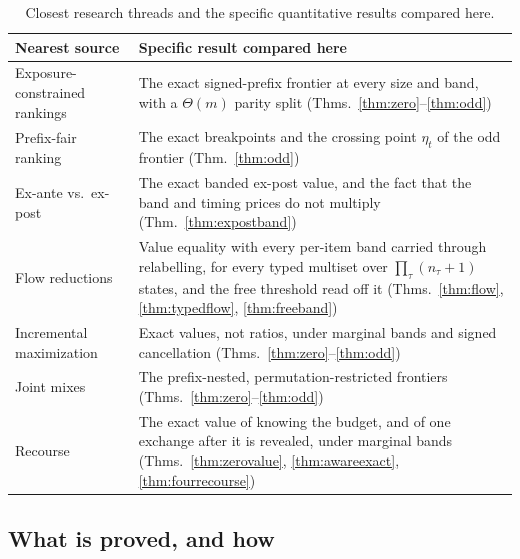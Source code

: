 \begin{table}[h]
\caption{Closest research threads and the specific quantitative results compared here.}
\label{tab:prior}
\centering
\footnotesize
\begin{tabular}{@{}p{}p{}@{}}
\toprule
Nearest source & Specific result compared here \\
\midrule
Exposure-constrained rankings~\cite{singh2018} & The exact signed-prefix frontier at every
size and band, with a $\Theta(m)$ parity split (Thms.~\ref{thm:zero}--\ref{thm:odd}) \\
Prefix-fair ranking~\cite{celis2018} & The exact breakpoints and the crossing point
$\eta_{t}$ of the odd frontier (Thm.~\ref{thm:odd}) \\
Ex-ante vs.\ ex-post~\cite{singh2021,freeman2020} & The exact banded ex-post value, and the
fact that the band and timing prices do not multiply (Thm.~\ref{thm:expostband}) \\
Flow reductions~\cite{schrijver2003} & Value equality with every per-item band carried
through relabelling, for every typed multiset over $\prod_\tau(n_\tau+1)$ states, and the free
threshold read off it (Thms.~\ref{thm:flow}, \ref{thm:typedflow}, \ref{thm:freeband}) \\
Incremental maximization~\cite{disser2023,bienkowski2026} & Exact values, not ratios, under
marginal bands and signed cancellation (Thms.~\ref{thm:zero}--\ref{thm:odd}) \\
Joint mixes~\cite{koike2022} & The prefix-nested, permutation-restricted frontiers
(Thms.~\ref{thm:zero}--\ref{thm:odd}) \\
Recourse~\cite{gupta2022} & The exact value of knowing the budget, and of one exchange after it
is revealed, under marginal bands (Thms.~\ref{thm:zerovalue}, \ref{thm:awareexact},
\ref{thm:fourrecourse}) \\
\bottomrule
\end{tabular}
\end{table}

\subsection{What is proved, and how}

